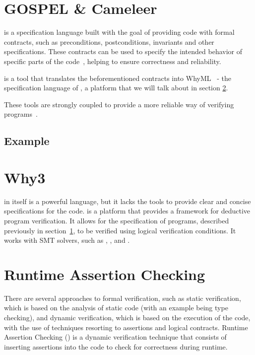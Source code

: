 \section{GOSPEL \& Cameleer}
\label{sec:gospel_and_cameleer}

\gospellang is a specification language built with the goal of providing \ocaml code 
with formal contracts, such as preconditions, postconditions, invariants and other 
specifications. These contracts can be used to specify the intended behavior of 
specific parts of the code~\cite{Soares_Chirica_Pereira2024}, helping to ensure correctness and reliability.

\cameleer is a tool that translates the beforementioned contracts into WhyML~\cite{Pereira_Ravara2021} - 
the specification language of \why, a platform that we will talk about in 
section \ref{sec:why3}.

These tools are strongly coupled to provide a more reliable way of verifying 
\ocaml programs~\cite{Pereira2024}.

\subsection{Example}
\label{sub:example}


\section{Why3}
\label{sec:why3}

\ocaml in itself is a powerful language, but it lacks the tools to provide clear 
and concise specifications for the code. \why is a platform that provides a framework 
for deductive program verification. It allows for the specification of programs, 
described previously in section~\ref{sec:gospel_and_cameleer}, to be verified using 
logical verification conditions. It works with SMT solvers, such as \zthree, \altergo, 
and \coq.

\section{Runtime Assertion Checking}
\label{sec:rac}

There are several approaches to formal verification, such as static verification, 
which is based on the analysis of static code (with an example being type checking), and dynamic 
verification, which is based on the execution of the code, with the use of 
techniques resorting to assertions and logical contracts. Runtime Assertion Checking 
(\rac) is a dynamic verification technique that consists of inserting assertions 
into the code to check for correctness during runtime.

